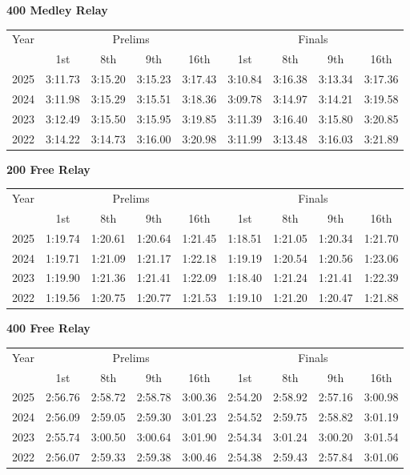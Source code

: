 \textbf{400 Medley Relay}

\begin{flushleft}
\begin{tabular}{|c|c|c|c|c|c|c|c|c|}
\hline
Year & \multicolumn{4}{c|}{Prelims} & \multicolumn{4}{c|}{Finals} \\
\cline{2-9}
& 1st & 8th & 9th & 16th & 1st & 8th & 9th & 16th \\
\hline
2025 & 3:11.73 & 3:15.20 & 3:15.23 & 3:17.43 & 3:10.84 & 3:16.38 & 3:13.34 & 3:17.36 \\
2024 & 3:11.98 & 3:15.29 & 3:15.51 & 3:18.36 & 3:09.78 & 3:14.97 & 3:14.21 & 3:19.58 \\
2023 & 3:12.49 & 3:15.50 & 3:15.95 & 3:19.85 & 3:11.39 & 3:16.40 & 3:15.80 & 3:20.85 \\
2022 & 3:14.22 & 3:14.73 & 3:16.00 & 3:20.98 & 3:11.99 & 3:13.48 & 3:16.03 & 3:21.89 \\
\hline
\end{tabular}
\end{flushleft}

\textbf{200 Free Relay}

\begin{flushleft}
\begin{tabular}{|c|c|c|c|c|c|c|c|c|}
\hline
Year & \multicolumn{4}{c|}{Prelims} & \multicolumn{4}{c|}{Finals} \\
\cline{2-9}
& 1st & 8th & 9th & 16th & 1st & 8th & 9th & 16th \\
\hline
2025 & 1:19.74 & 1:20.61 & 1:20.64 & 1:21.45 & 1:18.51 & 1:21.05 & 1:20.34 & 1:21.70 \\
2024 & 1:19.71 & 1:21.09 & 1:21.17 & 1:22.18 & 1:19.19 & 1:20.54 & 1:20.56 & 1:23.06 \\
2023 & 1:19.90 & 1:21.36 & 1:21.41 & 1:22.09 & 1:18.40 & 1:21.24 & 1:21.41 & 1:22.39 \\
2022 & 1:19.56 & 1:20.75 & 1:20.77 & 1:21.53 & 1:19.10 & 1:21.20 & 1:20.47 & 1:21.88 \\
\hline
\end{tabular}
\end{flushleft}

\textbf{400 Free Relay}

\begin{flushleft}
\begin{tabular}{|c|c|c|c|c|c|c|c|c|}
\hline
Year & \multicolumn{4}{c|}{Prelims} & \multicolumn{4}{c|}{Finals} \\
\cline{2-9}
& 1st & 8th & 9th & 16th & 1st & 8th & 9th & 16th \\
\hline
2025 & 2:56.76 & 2:58.72 & 2:58.78 & 3:00.36 & 2:54.20 & 2:58.92 & 2:57.16 & 3:00.98 \\
2024 & 2:56.09 & 2:59.05 & 2:59.30 & 3:01.23 & 2:54.52 & 2:59.75 & 2:58.82 & 3:01.19 \\
2023 & 2:55.74 & 3:00.50 & 3:00.64 & 3:01.90 & 2:54.34 & 3:01.24 & 3:00.20 & 3:01.54 \\
2022 & 2:56.07 & 2:59.33 & 2:59.38 & 3:00.46 & 2:54.38 & 2:59.43 & 2:57.84 & 3:01.06 \\
\hline
\end{tabular}
\end{flushleft}

